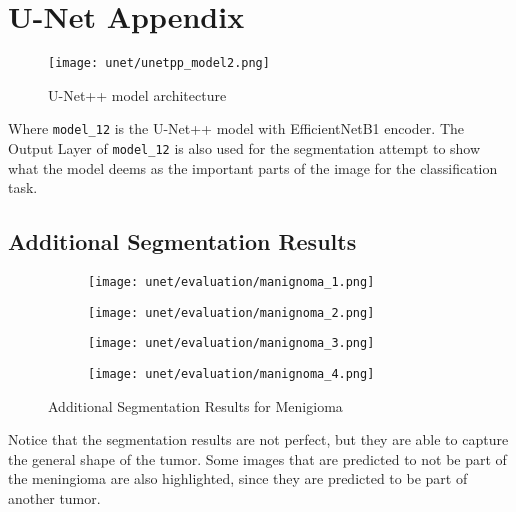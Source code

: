 \section{U-Net Appendix}\label{s:unetAppendix}

\begin{figure}[H]
  \begin{center}
    \texttt{[image: unet/unetpp\_model2.png]}
  \end{center}
  \caption{U-Net++ model architecture}\label{fig:unetpp_model}
\end{figure}

Where \texttt{model\_12} is the U-Net++ model with EfficientNetB1 encoder. The Output Layer of \texttt{model\_12} is also used for the segmentation attempt to show what the model deems as the important parts of the image for the classification task.

\subsection{Additional Segmentation Results}

\begin{figure}[H]
  \centering
  \begin{subfigure}[b]{0.23\textwidth}
    \centering
    \texttt{[image: unet/evaluation/manignoma\_1.png]}
  \end{subfigure}
  \hfill
  \begin{subfigure}[b]{0.23\textwidth}
    \centering
    \texttt{[image: unet/evaluation/manignoma\_2.png]}
  \end{subfigure}
  \hfill
  \begin{subfigure}[b]{0.23\textwidth}
    \centering
    \texttt{[image: unet/evaluation/manignoma\_3.png]}
  \end{subfigure}
  \hfill
  \begin{subfigure}[b]{0.23\textwidth}
    \centering
    \texttt{[image: unet/evaluation/manignoma\_4.png]}
  \end{subfigure}
  \caption{Additional Segmentation Results for Menigioma}
  \label{fig:additional_malignoma_segmentation}
\end{figure}

Notice that the segmentation results are not perfect, but they are able to capture the general shape of the tumor. Some images that are predicted to not be part of the meningioma are also highlighted, since they are predicted to be part of another tumor.


%
